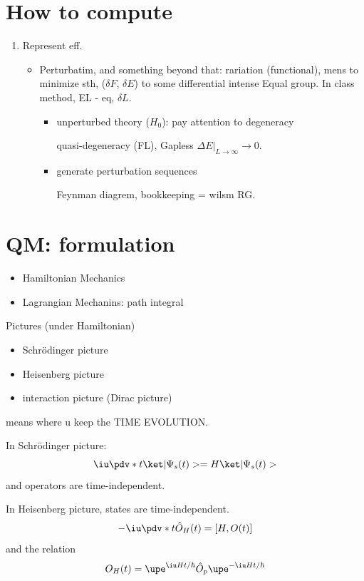 \section{How to compute}

\begin{enumerate}
  \item Represent eff.
  \begin{itemize}
    \item Perturbatim, and something beyond that: rariation (functional), mens to minimize sth, ($\delta F$, $\delta E$) to some differential intense Equal group.
    In class method, EL - eq, $\delta L$.
    \begin{itemize}
      \item unperturbed theory ($H_0$): pay attention to degeneracy

      quasi-degeneracy (FL), Gapless $\Delta E|_{L\to\infty} \to 0$.
      \item generate perturbation sequences

      Feynman diagrem, bookkeeping = wilsm RG.
    \end{itemize}
  \end{itemize}
\end{enumerate}

\section{QM: formulation}

\begin{itemize}
  \item Hamiltonian Mechanics
  \item Lagrangian Mechanins: path integral
\end{itemize}

Pictures (under Hamiltonian)
\begin{itemize}
  \item Schr\"odinger picture
  \item Heisenberg picture
  \item interaction picture (Dirac picture)
\end{itemize}
means where u keep the TIME EVOLUTION.

In Schr\"odinger picture:
\begin{equation}
  \iu\pdv*{}t \ket|\Psi_s(t)> = H\ket|\Psi_s(t)>
\end{equation}
and operators are time-independent.

In Heisenberg picture, states are time-independent.
\[
  -\iu \pdv*{}t \hat O_H(t) = [H, O(t)]
\]
and the relation
\[
  O_H(t) = \upe^{\iu Ht/\hbar} \hat O_p \upe^{-\iu Ht/\hbar}
\]

